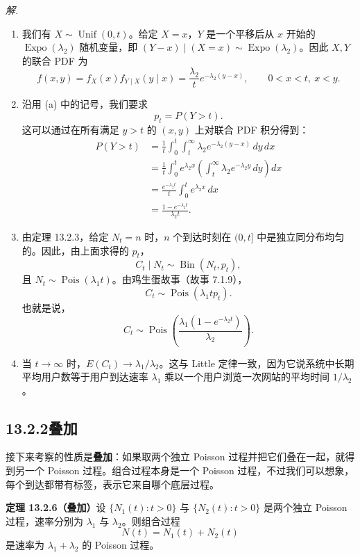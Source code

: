 \documentclass[UTF8,12pt,a4paper,fontset=fandol]{ctexart}
\begin{document}
\noindent\textit{解.}\quad
\begin{enumerate}
  \item 我们有 $X\sim\operatorname{Unif}(0,t)$。给定 $X=x$，$Y$ 是一个平移后从 $x$ 开始的 $\operatorname{Expo}(\lambda_2)$ 随机变量，即 $(Y-x)\mid (X=x)\sim\operatorname{Expo}(\lambda_2)$。因此 $X,Y$ 的联合 PDF 为
  \[
    f(x,y)=f_X(x)f_{Y\mid X}(y\mid x)
    =\frac{\lambda_2}{t}e^{-\lambda_2(y-x)},\qquad 0<x<t,\ x<y.
  \]
\item 沿用 (a) 中的记号，我们要求
\[
  p_t=P(Y>t).
\]
这可以通过在所有满足 $y>t$ 的 $(x,y)$ 上对联合 PDF 积分得到：
\[
\begin{aligned}
  P(Y>t)
  &=\frac1t\int_0^t\int_t^\infty \lambda_2 e^{-\lambda_2(y-x)}\,dy\,dx\\
  &=\frac1t\int_0^t e^{\lambda_2 x}
    \left(\int_t^\infty \lambda_2 e^{-\lambda_2 y}\,dy\right)dx\\
  &=\frac{e^{-\lambda_2 t}}{t}\int_0^t e^{\lambda_2 x}\,dx\\
  &=\frac{1-e^{-\lambda_2 t}}{\lambda_2 t}.
\end{aligned}
\]

\item 由定理 13.2.3，给定 $N_t=n$ 时，$n$ 个到达时刻在 $(0,t]$ 中是独立同分布均匀的。因此，由上面求得的 $p_t$，
\[
  C_t\mid N_t\sim \operatorname{Bin}(N_t,p_t),
\]
且 $N_t\sim\operatorname{Pois}(\lambda_1 t)$。由鸡生蛋故事（故事 7.1.9），
\[
  C_t\sim\operatorname{Pois}(\lambda_1tp_t).
\]
也就是说，
\[
  C_t\sim \operatorname{Pois}\left(\frac{\lambda_1(1-e^{-\lambda_2t})}{\lambda_2}\right).
\]

\item 当 $t\to\infty$ 时，$E(C_t)\to\lambda_1/\lambda_2$。这与 Little 定律一致，因为它说系统中长期平均用户数等于用户到达速率 $\lambda_1$ 乘以一个用户浏览一次网站的平均时间 $1/\lambda_2$。
\end{enumerate}

\subsection*{13.2.2\quad 叠加}

接下来考察的性质是\textbf{叠加}：如果取两个独立 Poisson 过程并把它们叠在一起，就得到另一个 Poisson 过程。组合过程本身是一个 Poisson 过程，不过我们可以想象，每个到达都带有标签，表示它来自哪个底层过程。

\noindent\textbf{定理 13.2.6（叠加）}\quad 设 $\{N_1(t):t>0\}$ 与 $\{N_2(t):t>0\}$ 是两个独立 Poisson 过程，速率分别为 $\lambda_1$ 与 $\lambda_2$。则组合过程
\[
  N(t)=N_1(t)+N_2(t)
\]
是速率为 $\lambda_1+\lambda_2$ 的 Poisson 过程。
\end{document}
